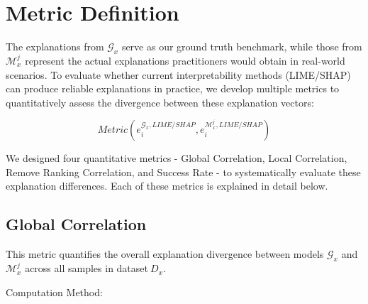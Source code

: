 \documentclass{article}
\begin{document}
\section{Metric Definition}

The explanations from $\mathcal{G}_{x}$ serve as our ground truth benchmark, while those from $\mathcal{M}_{x}^{j}$ represent the actual explanations practitioners would obtain in real-world scenarios. To evaluate whether current interpretability methods (LIME/SHAP) can produce reliable explanations in practice, we develop multiple metrics to quantitatively assess the divergence between these explanation vectors:

$$Metric(e_{i}^{\mathcal{G}_{x},LIME/SHAP},e_{i}^{\mathcal{M}_{x}^{j},LIME/SHAP})$$

We designed four quantitative metrics - Global Correlation, Local Correlation, Remove Ranking Correlation, and Success Rate - to systematically evaluate these explanation differences. Each of these metrics is explained in detail below.

\subsection{Global Correlation}

This metric quantifies the overall explanation divergence between models $\mathcal{G}_{x}$ and $\mathcal{M}_{x}^{j}$ across all samples in dataset${\ D}_{x}$.

Computation Method:
\end{document}
